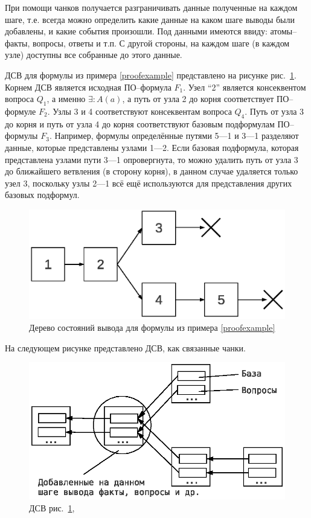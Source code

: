 При помощи чанков получается разграничивать данные полученные на каждом шаге, т.е. всегда можно определить какие данные на каком шаге выводы были добавлены, и какие события произошли. Под данными имеются ввиду: атомы--факты, вопросы, ответы и т.п. С другой стороны, на каждом шаге (в каждом узле) доступны все собранные до этого данные.

ДСВ для формулы из примера \ref{proofexample} представлено на рисунке рис.~\ref{fig:pst}. Корнем ДСВ является исходная ПО--формула $F_1$. Узел ``2'' является консеквентом вопроса $Q_1$, а именно $\exists\colon A(a)$, а путь от узла 2 до корня соответствует ПО--формуле $F_2$. Узлы 3 и 4 соответствуют консеквентам вопроса $Q_4$. Путь от узла 3 до корня и путь от узла 4 до корня соответствуют базовым подформулам ПО--формулы $F_3$. Например, формулы определённые путями 5---1 и 3---1 разделяют данные, которые представлены узлами 1---2. Если базовая подформула, которая представлена узлами пути 3---1 опровергнута, то можно удалить путь от узла 3 до ближайшего ветвления (в сторону корня), в данном случае удаляется только узел 3, поскольку узлы 2---1 всё ещё используются для представления других базовых подформул.
\begin{figure}[h]
	\centering
	\includegraphics[width=0.4\linewidth]{pics/PST.eps}
	\caption{Дерево состояний вывода для формулы из примера \ref{proofexample}}
	\label{fig:pst}
\end{figure}
На следующем рисунке представлено ДСВ, как связанные чанки.
\begin{figure}[h]
	\centering
	\includegraphics[width=0.6\linewidth]{pics/PST2.eps}
	\caption{ДСВ рис.~\ref{fig:pst}, }
	\label{fig:pst2}
\end{figure}

